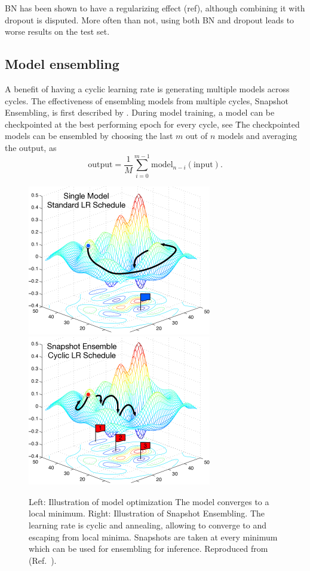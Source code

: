 BN has been shown to have a regularizing effect (ref), although combining it with dropout is disputed.
More often than not, using both BN and dropout leads to worse results on the test set.

\subsection{Model ensembling}\label{subsec:model_ensembling}
A benefit of having a cyclic learning rate is generating multiple models across cycles.
The effectiveness of ensembling models from multiple cycles, Snapshot Ensembling, is first described by \textcite{Huang2017}.
During model training, a model can be checkpointed at the best performing epoch for every cycle, see \.
The checkpointed models can be ensembled by choosing the last $m$ out of $n$ models and averaging the output, as
\begin{equation}
    \mathrm{output} = \frac{1}{M} \sum_{i=0}^{m-1} \mathrm{model}_{n-i}(\mathrm{input}).
\end{equation}
\begin{figure}
    \centering
    \includegraphics[width=0.48\linewidth]{ANN/images/ensembling_huang_left.png}
    \includegraphics[width=0.48\linewidth]{ANN/images/ensembling_huang_right.png}
    \caption[Snapshot ensembling]{
        Left: Illustration of model optimization The model converges to a local minimum.
        Right: Illustration of Snapshot Ensembling.
        The learning rate is cyclic and annealing, allowing to converge to and escaping from local minima.
        Snapshots are taken at every minimum which can be used for ensembling for inference.
        Reproduced from  (Ref.~\cite{Huang2017}).
    }
\end{figure}


